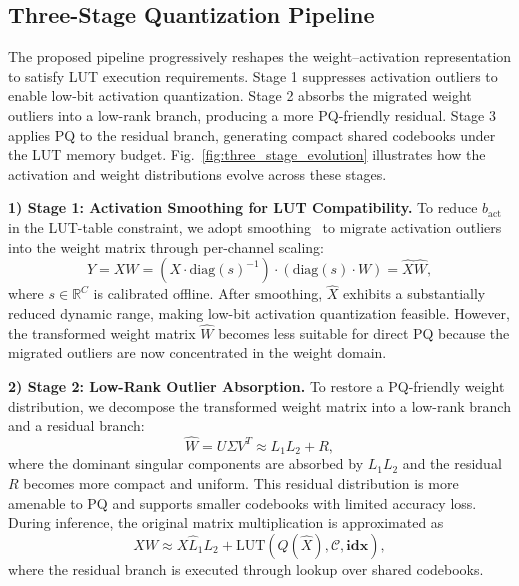 \subsection{Three-Stage Quantization Pipeline}

The proposed pipeline progressively reshapes the weight--activation representation to satisfy LUT execution requirements. Stage 1 suppresses activation outliers to enable low-bit activation quantization. Stage 2 absorbs the migrated weight outliers into a low-rank branch, producing a more PQ-friendly residual. Stage 3 applies PQ to the residual branch, generating compact shared codebooks under the LUT memory budget. Fig.~\ref{fig:three_stage_evolution} illustrates how the activation and weight distributions evolve across these stages.

\textbf{1) Stage 1: Activation Smoothing for LUT Compatibility.} To reduce $b_{\text{act}}$ in the LUT-table constraint, we adopt smoothing~\cite{smoothquant,svdquant} to migrate activation outliers into the weight matrix through per-channel scaling:
\begin{equation}
Y = XW = (X \cdot \mathrm{diag}(s)^{-1}) \cdot (\mathrm{diag}(s)\cdot W) = \hat{X}\hat{W},
\end{equation}
where $s \in \mathbb{R}^{C}$ is calibrated offline. After smoothing, $\hat{X}$ exhibits a substantially reduced dynamic range, making low-bit activation quantization feasible. However, the transformed weight matrix $\hat{W}$ becomes less suitable for direct PQ because the migrated outliers are now concentrated in the weight domain.

\textbf{2) Stage 2: Low-Rank Outlier Absorption.} To restore a PQ-friendly weight distribution, we decompose the transformed weight matrix into a low-rank branch and a residual branch:
\begin{equation}
\hat{W}=U\Sigma V^{T}\approx L_{1}L_{2}+R,
\end{equation}
where the dominant singular components are absorbed by $L_{1}L_{2}$ and the residual $R$ becomes more compact and uniform. This residual distribution is more amenable to PQ and supports smaller codebooks with limited accuracy loss. During inference, the original matrix multiplication is approximated as
\begin{equation}
XW \approx X\hat{L}_{1}L_{2} + \mathrm{LUT}(Q(\hat{X}),\mathcal{C},\mathbf{idx}),
\end{equation}
where the residual branch is executed through lookup over shared codebooks.

